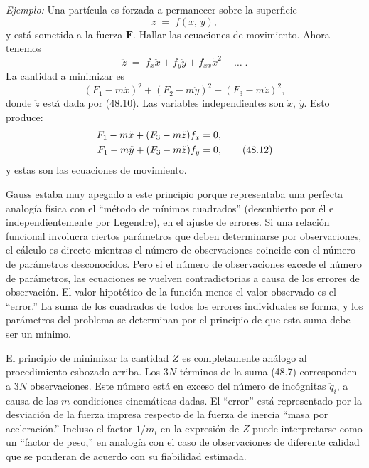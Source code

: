 \documentclass[12pt,a4paper]{book}
\begin{document}
\medskip
\noindent\textit{Ejemplo:} Una partícula es forzada a permanecer sobre la superficie
\begin{equation}
z \;=\; f(x,\,y), \tag{48.9}
\end{equation}
y está sometida a la fuerza $\mathbf{F}$. Hallar las ecuaciones de movimiento. Ahora tenemos
\begin{equation}
\ddot{z} \;=\; f_x\ddot{x} + f_y\ddot{y} + f_{xx}\dot{x}^2 + \ldots\;. \tag{48.10}
\end{equation}
La cantidad a minimizar es
\begin{equation}
(F_1 - m\ddot{x})^2 + (F_2 - m\ddot{y})^2 + (F_3 - m\ddot{z})^2, \tag{48.11}
\end{equation}
donde $\ddot{z}$ está dada por (48.10). Las variables independientes son $\ddot{x}$, $\ddot{y}$. Esto produce:
\begin{align}
F_1 - m\ddot{x} + (F_3 - m\ddot{z})f_x &= 0, \notag\\
F_1 - m\ddot{y} + (F_3 - m\ddot{z})f_y &= 0, \tag{48.12}
\end{align}
y estas son las ecuaciones de movimiento.

Gauss estaba muy apegado a este principio porque representaba una perfecta analogía física con el ``método de mínimos cuadrados'' (descubierto por él e independientemente por Legendre), en el ajuste de errores. Si una relación funcional involucra ciertos parámetros que deben determinarse por observaciones, el cálculo es directo mientras el número de observaciones coincide con el número de parámetros desconocidos. Pero si el número de observaciones excede el número de parámetros, las ecuaciones se vuelven contradictorias a causa de los errores de observación. El valor hipotético de la función menos el valor observado es el ``error.'' La suma de los cuadrados de todos los errores individuales se forma, y los parámetros del problema se determinan por el principio de que esta suma debe ser un mínimo.

El principio de minimizar la cantidad $Z$ es completamente análogo al procedimiento esbozado arriba. Los $3N$ términos de la suma (48.7) corresponden a $3N$ observaciones. Este número está en exceso del número de incógnitas $\ddot{q}_i$, a causa de las $m$ condiciones cinemáticas dadas. El ``error'' está representado por la desviación de la fuerza impresa respecto de la fuerza de inercia ``masa por aceleración.'' Incluso el factor $1/m_i$ en la expresión de $Z$ puede interpretarse como un ``factor de peso,'' en analogía con el caso de observaciones de diferente calidad que se ponderan de acuerdo con su fiabilidad estimada.
\end{document}
